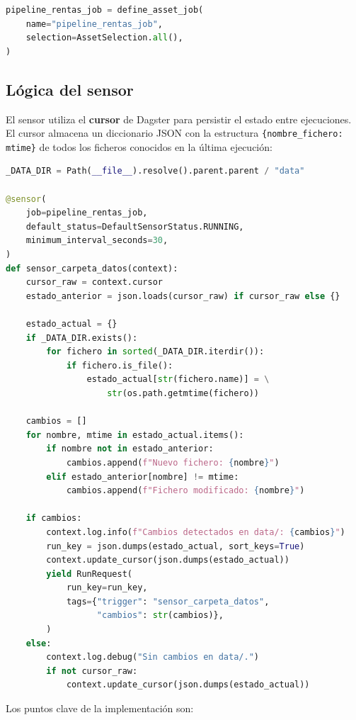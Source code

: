 \documentclass[11pt]{report}
\begin{document}
\begin{lstlisting}[style=mystyle, language=Python, caption={Job del pipeline completo}]
pipeline_rentas_job = define_asset_job(
    name="pipeline_rentas_job",
    selection=AssetSelection.all(),
)
\end{lstlisting}

\subsection{Lógica del sensor}

El sensor utiliza el \textbf{cursor} de Dagster para persistir el estado entre ejecuciones.
El cursor almacena un diccionario JSON con la estructura \texttt{\{nombre\_fichero: mtime\}}
de todos los ficheros conocidos en la última ejecución:

\begin{lstlisting}[style=mystyle, language=Python, caption={Sensor de vigilancia de la carpeta data/}]
_DATA_DIR = Path(__file__).resolve().parent.parent / "data"

@sensor(
    job=pipeline_rentas_job,
    default_status=DefaultSensorStatus.RUNNING,
    minimum_interval_seconds=30,
)
def sensor_carpeta_datos(context):
    cursor_raw = context.cursor
    estado_anterior = json.loads(cursor_raw) if cursor_raw else {}

    estado_actual = {}
    if _DATA_DIR.exists():
        for fichero in sorted(_DATA_DIR.iterdir()):
            if fichero.is_file():
                estado_actual[str(fichero.name)] = \
                    str(os.path.getmtime(fichero))

    cambios = []
    for nombre, mtime in estado_actual.items():
        if nombre not in estado_anterior:
            cambios.append(f"Nuevo fichero: {nombre}")
        elif estado_anterior[nombre] != mtime:
            cambios.append(f"Fichero modificado: {nombre}")

    if cambios:
        context.log.info(f"Cambios detectados en data/: {cambios}")
        run_key = json.dumps(estado_actual, sort_keys=True)
        context.update_cursor(json.dumps(estado_actual))
        yield RunRequest(
            run_key=run_key,
            tags={"trigger": "sensor_carpeta_datos",
                  "cambios": str(cambios)},
        )
    else:
        context.log.debug("Sin cambios en data/.")
        if not cursor_raw:
            context.update_cursor(json.dumps(estado_actual))
\end{lstlisting}

Los puntos clave de la implementación son:
\end{document}
